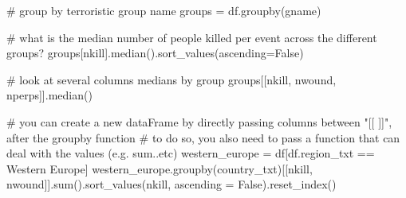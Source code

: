 \documentclass[
  letterpaper,
  DIV=11,
  numbers=noendperiod]{scrreprt}
\newenvironment{Shaded}{\begin{snugshade}}{\end{snugshade}}
\newcommand{\BuiltInTok}[1]{\textcolor[rgb]{0.00,0.23,0.31}{#1}}
\newcommand{\CommentTok}[1]{\textcolor[rgb]{0.37,0.37,0.37}{#1}}
\newcommand{\NormalTok}[1]{\textcolor[rgb]{0.00,0.23,0.31}{#1}}
\newcommand{\OperatorTok}[1]{\textcolor[rgb]{0.37,0.37,0.37}{#1}}
\newcommand{\StringTok}[1]{\textcolor[rgb]{0.13,0.47,0.30}{#1}}
\newcommand{\VariableTok}[1]{\textcolor[rgb]{0.07,0.07,0.07}{#1}}
\begin{document}
\begin{Shaded}
\begin{Highlighting}[]
\CommentTok{\# group by terroristic group name}
\NormalTok{groups }\OperatorTok{=}\NormalTok{ df.groupby(}\StringTok{\textquotesingle{}gname\textquotesingle{}}\NormalTok{)}
\end{Highlighting}
\end{Shaded}

\begin{Shaded}
\begin{Highlighting}[]
\CommentTok{\# what is the median number of people killed per event across the different groups?}
\NormalTok{groups[}\StringTok{\textquotesingle{}nkill\textquotesingle{}}\NormalTok{].median().sort\_values(ascending}\OperatorTok{=}\VariableTok{False}\NormalTok{)}
\end{Highlighting}
\end{Shaded}

\begin{Shaded}
\begin{Highlighting}[]
\CommentTok{\# look at several columns\textquotesingle{} medians by group}
\NormalTok{groups[[}\StringTok{\textquotesingle{}nkill\textquotesingle{}}\NormalTok{, }\StringTok{\textquotesingle{}nwound\textquotesingle{}}\NormalTok{, }\StringTok{\textquotesingle{}nperps\textquotesingle{}}\NormalTok{]].median()}
\end{Highlighting}
\end{Shaded}

\begin{Shaded}
\begin{Highlighting}[]
\CommentTok{\# you can create a new dataFrame by directly passing columns between "[[ ]]", after the groupby function}
\CommentTok{\# to do so, you also need to pass a function that can deal with the values (e.g. sum..etc) }
\NormalTok{western\_europe }\OperatorTok{=}\NormalTok{ df[df.region\_txt }\OperatorTok{==} \StringTok{\textquotesingle{}Western Europe\textquotesingle{}}\NormalTok{]}
\NormalTok{western\_europe.groupby(}\StringTok{\textquotesingle{}country\_txt\textquotesingle{}}\NormalTok{)[[}\StringTok{\textquotesingle{}nkill\textquotesingle{}}\NormalTok{, }\StringTok{\textquotesingle{}nwound\textquotesingle{}}\NormalTok{]].}\BuiltInTok{sum}\NormalTok{().sort\_values(}\StringTok{\textquotesingle{}nkill\textquotesingle{}}\NormalTok{, ascending }\OperatorTok{=} \VariableTok{False}\NormalTok{).reset\_index()}
\end{Highlighting}
\end{Shaded}
\end{document}

